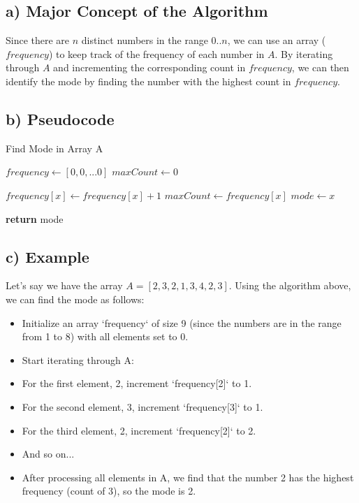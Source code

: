 \documentclass[12pt, letterpaper]{article}
\begin{document}
\subsection{a) Major Concept of the Algorithm}
Since there are $n$ distinct numbers in the range $0..n$, we can use an array ($frequency$) to keep track of the frequency of each number in $A$. By iterating through $A$ and incrementing the corresponding count in $frequency$, we can then identify the mode by finding the number with the highest count in $frequency$.

\subsection{b) Pseudocode}
\begin{algorithm}
\caption{Find Mode in Array A}
\label{alg:find_mode}
\begin{algorithmic}[H]

\State $frequency \gets [0,0,...0]$ 
\State $maxCount \gets 0$

    \State $frequency[x] \gets frequency[x] + 1$
        \State $maxCount \gets frequency[x]$
        \State $mode \gets x$
    \EndIf
\EndFor

\State \textbf{return} mode
\end{algorithmic}
\end{algorithm}

\subsection{c) Example}
Let's say we have the array $A = [2, 3, 2, 1, 3, 4, 2, 3]$. Using the algorithm above, we can find the mode as follows:
\begin{itemize}
    \item Initialize an array `frequency` of size 9 (since the numbers are in the range from 1 to 8) with all elements set to 0.
    \item  Start iterating through A:
    \item  For the first element, 2, increment `frequency[2]` to 1.
    \item For the second element, 3, increment `frequency[3]` to 1.
    \item For the third element, 2, increment `frequency[2]` to 2.
    \item  And so on...
    \item After processing all elements in A, we find that the number 2 has the highest frequency (count of 3), so the mode is 2.
\end{itemize}
\end{document}
